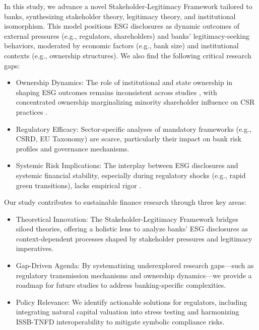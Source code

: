 \documentclass[
  authoryear]{elsarticle}
\begin{document}
In this study, we advance a novel Stakeholder-Legitimacy Framework
\citep{CAMPBELL2007, AGUINIS2012} tailored to banks, synthesizing
stakeholder theory, legitimacy theory, and institutional isomorphism.
This model positions ESG disclosures as dynamic outcomes of external
pressures (e.g., regulators, shareholders) and banks' legitimacy-seeking
behaviors, moderated by economic factors (e.g., bank size) and
institutional contexts (e.g., ownership structures). We also find the
following critical research gaps:

\begin{itemize}
\item
  Ownership Dynamics: The role of institutional and state ownership in
  shaping ESG outcomes remains inconsistent across studies
  \citep{DYCK2019, RAIMO2020}, with concentrated ownership marginalizing
  minority shareholder influence on CSR practices \citep{SMITH2022}.
\item
  Regulatory Efficacy: Sector-specific analyses of mandatory frameworks
  (e.g., CSRD, EU Taxonomy) are scarce, particularly their impact on
  bank risk profiles and governance mechanisms.
\item
  Systemic Risk Implications: The interplay between ESG disclosures and
  systemic financial stability, especially during regulatory shocks
  (e.g., rapid green transitions), lacks empirical rigor
  \citep{ESRB2016}.
\end{itemize}

Our study contributes to sustainable finance research through three key
areas:

\begin{itemize}
\item
  Theoretical Innovation: The Stakeholder-Legitimacy Framework bridges
  siloed theories, offering a holistic lens to analyze banks' ESG
  disclosures as context-dependent processes shaped by stakeholder
  pressures and legitimacy imperatives.
\item
  Gap-Driven Agenda: By systematizing underexplored research gaps---such
  as regulatory transmission mechanisms and ownership dynamics---we
  provide a roadmap for future studies to address banking-specific
  complexities.
\item
  Policy Relevance: We identify actionable solutions for regulators,
  including integrating natural capital valuation into stress testing
  and harmonizing ISSB-TNFD interoperability to mitigate symbolic
  compliance risks.
\end{itemize}
\end{document}
